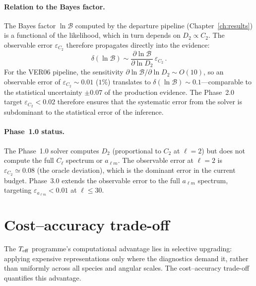 \paragraph{Relation to the Bayes factor.}

The Bayes factor $\ln \mathcal{B}$ computed by the
departure pipeline (Chapter~\ref{ch:results}) is a
functional of the likelihood, which in turn depends on
$D_2 \propto C_2$.  The observable error
$\varepsilon_{C_2}$ therefore propagates directly into the
evidence:
\begin{equation}\label{eq:err-lnB}
\delta(\ln \mathcal{B})
\sim \frac{\partial \ln \mathcal{B}}
          {\partial \ln D_2}\,
     \varepsilon_{C_2}\,.
\end{equation}
For the VER06 pipeline, the sensitivity
$\partial \ln \mathcal{B} / \partial \ln D_2 \sim
O(10)$, so an observable error of $\varepsilon_{C_2}
\sim 0.01$ ($1\%$) translates to
$\delta(\ln \mathcal{B}) \sim 0.1$---comparable to the
statistical uncertainty $\pm 0.07$ of the production
evidence.  The Phase~2.0 target
$\varepsilon_{C_2} < 0.02$ therefore ensures that the
systematic error from the solver is subdominant to the
statistical error of the inference.


\paragraph{Phase~1.0 status.}

The Phase~1.0 solver computes $D_2$ (proportional to
$C_2$ at $\ell = 2$) but does not compute the full
$C_\ell$ spectrum or $a_{\ell m}$.  The observable
error at $\ell = 2$ is $\varepsilon_{C_2} \simeq 0.08$
(the oracle deviation), which is the dominant error in
the current budget.  Phase~3.0 extends the observable
error to the full $a_{\ell m}$ spectrum, targeting
$\varepsilon_{a_{\ell m}} < 0.01$ at $\ell \leq 30$.


\section{Cost--accuracy trade-off}
\label{sec:err-cost}

The $T_{\mathrm{eff}}$ programme's computational advantage lies in
selective upgrading: applying expensive representations
only where the diagnostics demand it, rather than
uniformly across all species and angular scales.  The
cost--accuracy trade-off quantifies this advantage.


